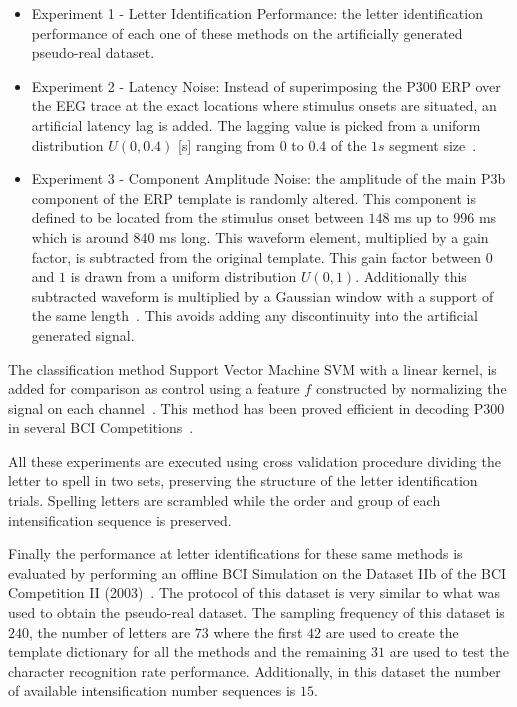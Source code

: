 \documentclass[brainsci,article,submit,moreauthors,pdftex,10pt,a4paper]{mdpi}
\begin{document}
\begin{itemize}
\item Experiment 1 - Letter Identification Performance: the letter identification performance of each one of these methods on the artificially generated pseudo-real dataset.
\item Experiment 2 - Latency Noise:  Instead of superimposing the P300 ERP over the EEG trace at the exact locations where stimulus onsets are situated, an artificial latency lag is added.  The lagging value is picked from a uniform distribution $U(0,0.4)$ [s] ranging from $0$ to $0.4$ of the $1s$ segment size~\citep{DaPelo2018}.
\item Experiment 3 - Component Amplitude Noise: the amplitude of the main P3b component of the ERP template is randomly altered.  This component is defined to be located from the stimulus onset between $148$ ms up to $996$ ms which is around $840$ ms long.  This waveform element, multiplied by a gain factor, is subtracted from the original template.  This gain factor between $0$ and $1$ is drawn from a uniform distribution $U(0,1)$.  Additionally this subtracted waveform is multiplied by a Gaussian window with a support of the same length~\citep{Harris1978}.  This avoids adding any discontinuity into the artificial generated signal.
\end{itemize}

The classification method Support Vector Machine SVM with a linear kernel, is added for comparison as control using a feature $f$ constructed by normalizing the signal on each channel~\citep{Krusienski2006}.  This method has been proved efficient in decoding P300 in several BCI Competitions~\citep{Kaper2004}. 

All these experiments are executed using cross validation procedure dividing the letter to spell in two sets, preserving the structure of the letter identification trials. Spelling letters are scrambled while the order and group of each intensification sequence is preserved.

Finally the performance at letter identifications for these same methods is evaluated by performing an offline BCI Simulation on the Dataset IIb of the BCI Competition II (2003)~\citep{Blankertz2002}.  The protocol of this dataset is very similar to what was used to obtain the pseudo-real dataset.  The sampling frequency of this dataset is $240$, the number of letters are $73$ where the first $42$ are used to create the template dictionary for all the methods and the remaining $31$ are used to test the character recognition rate performance.  Additionally, in this dataset the number of available intensification number sequences is $15$.  
\end{document}
